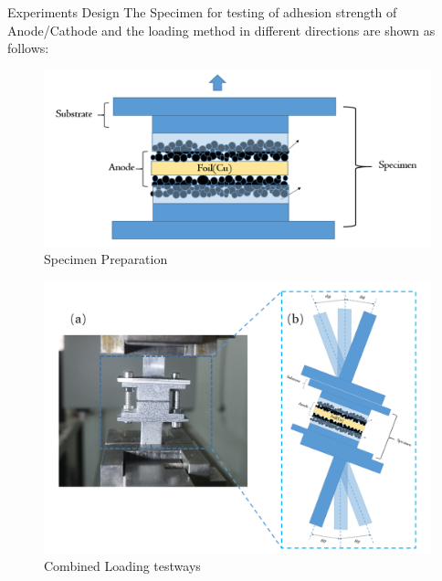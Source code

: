 \documentclass[final]{beamer}
\newlength{\onecolwid}
\newlength{\twocolwid}
\begin{document}
\begin{frame}[t]
\begin{columns}[t]
\begin{column}{\twocolwid} %

\begin{columns}[t,totalwidth=\twocolwid] %

\begin{column}{\onecolwid}\vspace{-.6in} %


\begin{block}{Experiments Design}
The Specimen for testing of adhesion strength of Anode/Cathode and the loading method in different directions are shown as follows:
\begin{figure}
\includegraphics[width=\linewidth]{Specimen.png}
\caption{Specimen Preparation}
\end{figure}
\begin{figure}
\includegraphics[width=\linewidth]{combine.png}
\caption{Combined Loading testways}
\end{figure}


\end{block}
\end{column}
\end{columns}
\end{column}
\end{columns}
\end{frame}
\end{document}
